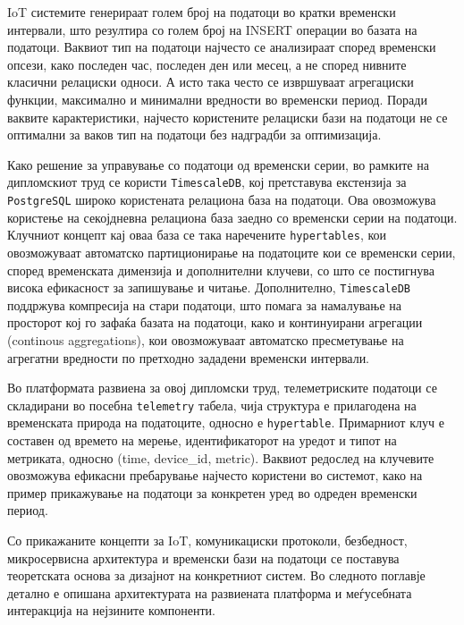 IoT системите генерираат голем број на податоци во кратки временски
интервали, што резултира со голем број на INSERT операции во базата на
податоци. Ваквиот тип на податоци најчесто се анализираат според
временски опсези, како последен час, последен ден или месец, а не според
нивните класични релациски односи. А исто така често се извршуваат
агрегациски функции, максимално и минимални вредности во временски
период. Поради ваквите карактеристики, најчесто користените релациски
бази на податоци не се оптимални за ваков тип на податоци без надградби
за оптимизација.

Како решение за управување со податоци од временски серии, во рамките на
дипломскиот труд се користи \texttt{TimescaleDB}, кој претставува екстензија за
\texttt{PostgreSQL} широко користената релациона база на податоци. Ова овозможува
користење на секојдневна релациона база заедно со временски серии на
податоци. Клучниот концепт кај оваа база се така наречените \texttt{hypertables},
кои овозможуваат автоматско партиционирање на податоците кои се
временски серии, според временската димензија и дополнителни клучеви, со
што се постигнува висока ефикасност за запишување и читање.
Дополнително, \texttt{TimescaleDB} поддржува компресија на стари податоци, што
помага за намалување на просторот кој го зафаќа базата на податоци, како
и континуирани агрегации (continous aggregations), кои овозможуваат
автоматско пресметување на агрегатни вредности по претходно зададени
временски интервали.

Во платформата развиена за овој дипломски труд, телеметриските податоци
се складирани во посебна \texttt{telemetry} табела, чија структура е прилагодена
на временската природа на податоците, односно е \texttt{hypertable}. Примарниот
клуч е составен од времето на мерење, идентификаторот на уредот и типот
на метриката, односно (time, device\_id, metric). Ваквиот редослед на
клучевите овозможува ефикасни пребарување најчесто користени во
системот, како на пример прикажување на податоци за конкретен уред во
одреден временски период.

Со прикажаните концепти за IoT, комуникациски протоколи, безбедност, микросервисна архитектура и временски бази на податоци се поставува теоретската основа за дизајнот на конкретниот систем. Во следното поглавје детално е опишана архитектурата на развиената платформа и меѓусебната интеракција на нејзините компоненти.